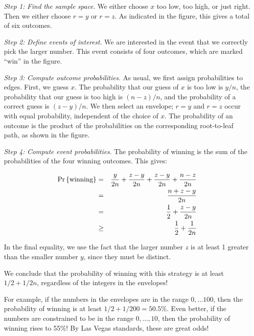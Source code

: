 \documentclass[11pt,twoside]{article}
\begin{document}

\emph{Step 1: Find the sample space.} We either choose $x$ too low, too
high, or just right.  Then we either choose $r=y$ or $r=z$.  As
indicated in the figure, this gives a total of six outcomes.

\emph{Step 2: Define events of interest.} We are interested in the
event that we correctly pick the larger number.  This event consists
of four outcomes, which are marked ``win'' in the figure.

\emph{Step 3: Compute outcome probabilities.} As usual, we first assign
probabilities to edges.  First, we guess $x$.  The probability that our
guess of $x$ is too low is $y/n$, the probability that our
guess is too high is $(n-z)/n$, and the probability of a correct
guess is $(z-y)/n$.  We then select an envelope; $r=y$ and $r=z$
occur with equal probability, independent of the choice of $x$.  The
probability of an outcome is the product of the probabilities on the
corresponding root-to-leaf path, as shown in the figure.

\emph{Step 4: Compute event probabilities.} The probability of winning
is the sum of the probabilities of the four winning outcomes.  This
gives:

\begin{eqnarray*}
\mathop{\textup{Pr}}\nolimits\left\{\mbox{winning}\right\}
        & = & \frac{y}{2n} + \frac{z-y}{2n} + \frac{z-y}{2n} + \frac{n-z}{2n}\\
        & = & \frac{n + z - y}{2n} \\
        & = & \frac{1}{2} + \frac{z - y}{2n} \\
        & \geq & \frac{1}{2} + \frac{1}{2n}
\end{eqnarray*}

In the final equality, we use the fact that the larger number $z$ is
at least 1 greater than the smaller number $y$, since they must be
distinct.

We conclude that the probability of winning with this strategy is at
least $1/2 + 1/2n$, regardless of the integers in the
envelopes!

For example, if the numbers in the envelopes are in the range $0,
\ldots 100$, then the probability of winning is at least $1/2 +
1/200 = 50.5\%$.  Even better, if the numbers are constrained to
be in the range $0, \ldots, 10$, then the probability of winning rises
to 55\%!  By Las Vegas standards, these are great odds!
\end{document}
